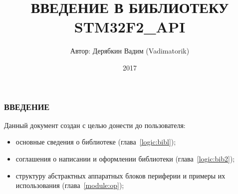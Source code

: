 \documentclass[a4paper, 12pt]{report}		%
\begin{document}
	\title {ВВЕДЕНИЕ В БИБЛИОТЕКУ STM32F2\_API}			%
	\author {Автор: Дерябкин Вадим (Vadimatorik)}
	\date {2017}
	\maketitle

\subsubsection{ВВЕДЕНИЕ}
Данный документ создан с целью донести до пользователя:
\begin{itemize}
	\item основные сведения о библиотеке (глава~\ref{logic:bibl});
	\item соглашения о написании и оформлении библиотеки (глава~\ref{logic:bib2});
	\item структуру абстрактных аппаратных блоков периферии и примеры их использования (глава~\ref{module:op});
\end{itemize}

\tableofcontents
\clearpage								%
	

\end{document}

